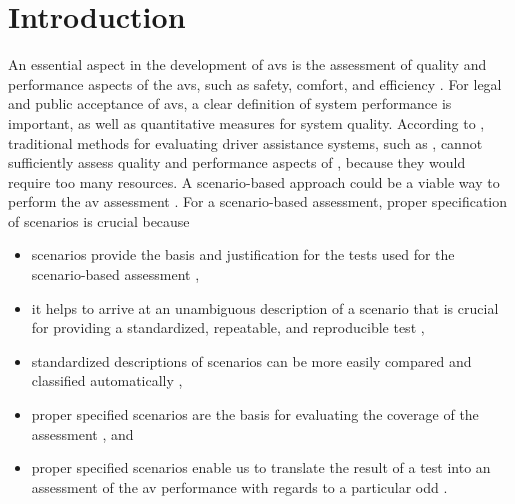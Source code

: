 \section{Introduction}
\label{sec:introduction}

An essential aspect in the development of \acp{av} is the assessment of quality and performance aspects of the \acp{av}, such as safety, comfort, and efficiency \autocite{bengler2014threedecades, wachenfeld2016release, Helmer2017safety, stellet2015taxonomy, gietelink2006development, putz2017pegasus, roesener2017comprehensive, riedmaier2020survey}.
For legal and public acceptance of \acp{av}, a clear definition of system performance is important, as well as quantitative measures for system quality. 
According to \autocite{wachenfeld2016release}, traditional methods for evaluating driver assistance systems, such as \autocite{response2006code, ISO26262}, cannot sufficiently assess quality and performance aspects of , because they would require too many resources. 
\cstartc A scenario-based approach could be a viable way to perform the \ac{av} assessment \autocite{putz2017pegasus, elrofai2018scenario, riedmaier2020survey}. 
For a scenario-based assessment, proper specification of scenarios is crucial because 
\begin{itemize}
	\item scenarios \cendc\cstartd provide the basis and justification for \cendd\cstartc the tests used for the scenario-based assessment \autocite{stellet2015taxonomy, aparicio2013pre, ulbrich2015, geyer2014, putz2017pegasus, zofka2015datadrivetrafficscenarios},
	\item it helps to arrive at an unambiguous description of a scenario that is crucial for providing a standardized, repeatable, and reproducible test \autocite{aparicio2013pre},
	\item standardized descriptions of scenarios can be more easily compared and classified \cendc\cstartd automatically \cendd\cstartc\autocite{degelder2019scenariocategories},
	\item proper specified scenarios are the basis for evaluating the coverage of the assessment \autocite{putz2017pegasus}, and
	\item proper specified scenarios enable us to translate the result of a test into an assessment of the \ac{av} performance with regards to a particular \ac{odd} \autocite{weber2019framework, gyllenhammar2020towards}.
\end{itemize}

